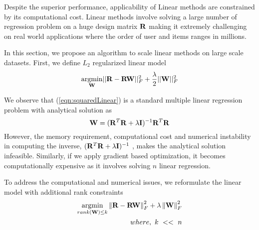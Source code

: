 

Despite the superior performance, applicability of Linear methods are constrained by its computational cost. Linear methods involve solving  a large number of regression problem on a huge design matrix $\mathbf{R}$ making it extremely challenging on real world applications where the order of user and items ranges in millions.

In this section, we propose an algorithm to scale linear methods on large scale datasets. First, we define $L_2$ regularized linear model 
\begin{equation}
\label{eqn:squaredLinear}
\underset{\mathbf{W}}{\mathrm{argmin}}|| \mathbf{R} - \mathbf{R} \mathbf{W} ||_F^2 + \frac{\lambda}{2} || \mathbf{W} ||_F^2 
\end{equation}

We observe that (\ref{eqn:squaredLinear}) is a  standard multiple linear regression problem with analytical solution as
\begin{equation}
\mathbf{W} = (\mathbf{R}^T \mathbf{R} + \lambda \mathbf{I})^{-1} \mathbf{R}^T \mathbf{R}
\end{equation}
However, the  memory requirement, computational cost and  numerical instability in computing the inverse, $(\mathbf{R}^T \mathbf{R} + \lambda \mathbf{I})^{-1}$ , makes the analytical solution infeasible. Similarly, if we apply gradient based optimization, it becomes computationally expensive as it involves solving $n$ linear regression.

To address the computational and numerical issues, we reformulate the linear model with additional rank constraints 
\begin{align}
\label{eqn:reg-rank}
\begin{split}
\underset{rank(\mathbf{W}) \le k}{\mathrm{argmin}}  \left \| \mathbf{R} - \mathbf{R}\mathbf{W}\right \|_F^2 + \lambda \left \|  \mathbf{W} \right \|_F^2 \\
where,\ k\ <<\ n 
\end{split}
\end{align}

